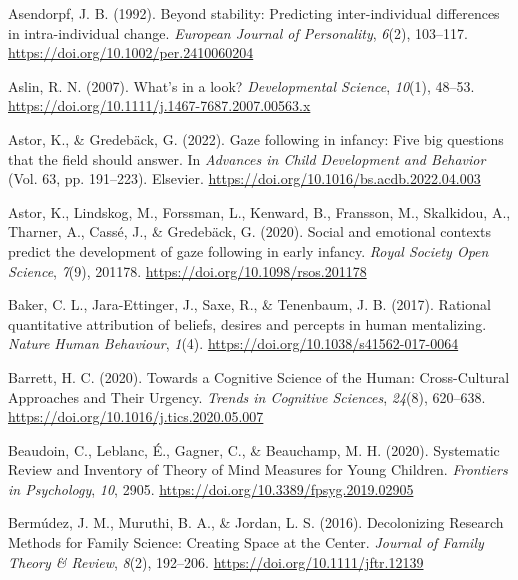 \documentclass[
]{scrbook}
\newlength{\cslhangindent}
\newenvironment{CSLReferences}[2] %
 {\begin{list}{}{%
  \setlength{\itemindent}{0pt}
  \setlength{\leftmargin}{0pt}
  \setlength{\parsep}{0pt}
  \ifodd #1
   \setlength{\leftmargin}{\cslhangindent}
   \setlength{\itemindent}{-1\cslhangindent}
  \fi
  \setlength{\itemsep}{#2\baselineskip}}}
 {\end{list}}
\begin{document}
\begin{CSLReferences}{1}{0}
Asendorpf, J. B. (1992). Beyond stability: {Predicting} inter-individual differences in intra-individual change. \emph{European Journal of Personality}, \emph{6}(2), 103--117. \url{https://doi.org/10.1002/per.2410060204}

Aslin, R. N. (2007). What's in a look? \emph{Developmental Science}, \emph{10}(1), 48--53. \url{https://doi.org/10.1111/j.1467-7687.2007.00563.x}

Astor, K., \& Gredebäck, G. (2022). Gaze following in infancy: {Five} big questions that the field should answer. In \emph{Advances in {Child Development} and {Behavior}} (Vol. 63, pp. 191--223). Elsevier. \url{https://doi.org/10.1016/bs.acdb.2022.04.003}

Astor, K., Lindskog, M., Forssman, L., Kenward, B., Fransson, M., Skalkidou, A., Tharner, A., Cassé, J., \& Gredebäck, G. (2020). Social and emotional contexts predict the development of gaze following in early infancy. \emph{Royal Society Open Science}, \emph{7}(9), 201178. \url{https://doi.org/10.1098/rsos.201178}

Baker, C. L., Jara-Ettinger, J., Saxe, R., \& Tenenbaum, J. B. (2017). Rational quantitative attribution of beliefs, desires and percepts in human mentalizing. \emph{Nature Human Behaviour}, \emph{1}(4). \url{https://doi.org/10.1038/s41562-017-0064}

Barrett, H. C. (2020). Towards a {Cognitive Science} of the {Human}: {Cross-Cultural Approaches} and {Their Urgency}. \emph{Trends in Cognitive Sciences}, \emph{24}(8), 620--638. \url{https://doi.org/10.1016/j.tics.2020.05.007}

Beaudoin, C., Leblanc, É., Gagner, C., \& Beauchamp, M. H. (2020). Systematic {Review} and {Inventory} of {Theory} of {Mind Measures} for {Young Children}. \emph{Frontiers in Psychology}, \emph{10}, 2905. \url{https://doi.org/10.3389/fpsyg.2019.02905}

Bermúdez, J. M., Muruthi, B. A., \& Jordan, L. S. (2016). Decolonizing {Research Methods} for {Family Science}: {Creating Space} at the {Center}. \emph{Journal of Family Theory \& Review}, \emph{8}(2), 192--206. \url{https://doi.org/10.1111/jftr.12139}


\end{CSLReferences}
\end{document}
